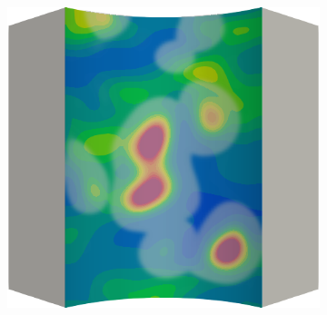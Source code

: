 \begin{frame}
\begin{columns}[T]
\begin{column}{0.6\textwidth}
\begin{figure}
{\begin{subfigure}{0.19\textwidth}
          \end{subfigure}
          \hspace{0.06\textwidth}
          \begin{subfigure}{0.19\textwidth}
            \centering
            \includegraphics[width=\textwidth]{examples/figures/ep.0024}
          \end{subfigure}
        }
        

\end{figure}
\end{column}
\end{columns}
\end{frame}
